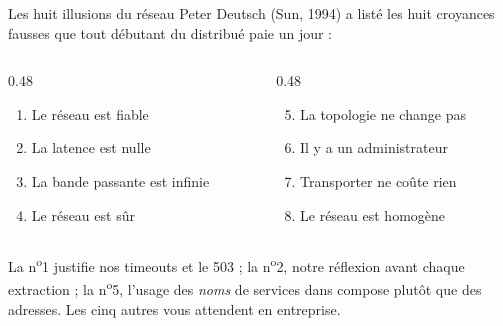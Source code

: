 \documentclass[aspectratio=169,11pt]{beamer}
\begin{document}
\begin{frame}{Les huit illusions du réseau}
{\small Peter Deutsch (Sun, 1994) a listé les huit croyances fausses que tout débutant du distribué paie un jour :}
\begin{columns}[t]
\begin{column}{0.48\linewidth}
{\small\begin{enumerate}
  \item Le réseau est fiable
  \item La latence est nulle
  \item La bande passante est infinie
  \item Le réseau est sûr
\end{enumerate}}
\end{column}
\begin{column}{0.48\linewidth}
{\small\begin{enumerate}\setcounter{enumi}{4}
  \item La topologie ne change pas
  \item Il y a un administrateur
  \item Transporter ne coûte rien
  \item Le réseau est homogène
\end{enumerate}}
\end{column}
\end{columns}
\vskip4pt
\begin{ucadpiege}
{\small La n\textsuperscript{o}1 justifie nos timeouts et le 503 ; la n\textsuperscript{o}2, notre réflexion avant chaque extraction ; la n\textsuperscript{o}5, l'usage des \emph{noms} de services dans compose plutôt que des adresses. Les cinq autres vous attendent en entreprise.}
\end{ucadpiege}
\end{frame}
\end{document}
